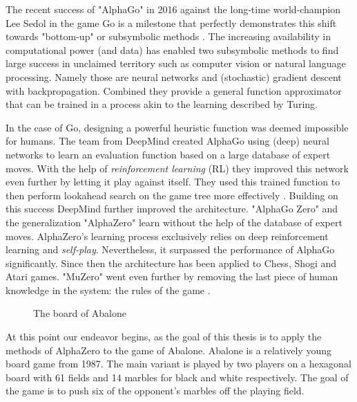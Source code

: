 The recent success of "AlphaGo" in 2016 against the long-time world-champion Lee Sedol \cite{deepmind_match_nodate} in the game Go is a milestone that perfectly demonstrates this shift towards "bottom-up" or subsymbolic methods \cite{nilsson_artificial_1998}. The increasing availability in computational power (and data) has enabled two subsymbolic methods to find large success in unclaimed territory such as computer vision or natural language processing. Namely those are neural networks and (stochastic) gradient descent with backpropagation. Combined they provide a general function approximator that can be trained in a process akin to the learning described by Turing.

In the case of Go, designing a powerful heuristic function was deemed impossible for humans. The team from DeepMind created AlphaGo using (deep) neural networks to learn an evaluation function based on a large database of expert moves. With the help of \textit{reinforcement learning} (RL) they improved this network even further by letting it play against itself. They used this trained function to then perform lookahead search on the game tree more effectively \cite{silver_mastering_2017}. Building on this success DeepMind further improved the architecture. "AlphaGo Zero" and the generalization "AlphaZero" learn without the help of the database of expert moves. AlphaZero's learning process exclusively relies on deep reinforcement learning and \textit{self-play}. Nevertheless, it surpassed the performance of AlphaGo significantly. Since then the architecture has been applied to Chess, Shogi and Atari games. "MuZero" went even further by removing the last piece of human knowledge in the system: the rules of the game \cite{schrittwieser_mastering_2020}.

\begin{figure}[H]
    \centering
    \caption{The board of Abalone}
    \label{abalone_boards}
\end{figure}


At this point our endeavor begins, as the goal of this thesis is to apply the methods of AlphaZero to the game of Abalone. Abalone is a relatively young board game from 1987. The main variant is played by two players on a hexagonal board with 61 fields and 14 marbles for black and white respectively. The goal of the game is to push six of the opponent's marbles off the playing field.

